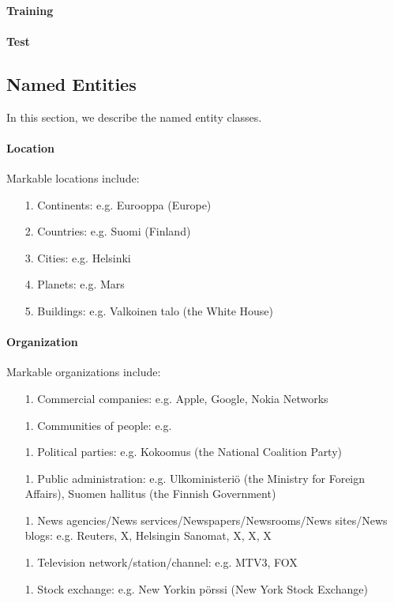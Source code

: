 \documentclass[11pt]{article}
\begin{document}
\paragraph{Training}

  

\paragraph{Test}



\subsection{Named Entities}

In this section, we describe the named entity classes.


\paragraph{Location}

Markable locations include:

\begin{itemize}

\item[1.] Continents: e.g. Eurooppa (Europe)
\item[2.] Countries: e.g. Suomi (Finland)
\item[3.] Cities: e.g. Helsinki
\item[4.] Planets: e.g. Mars
\item[5.] Buildings: e.g. Valkoinen talo (the White House)

\end{itemize}


\paragraph{Organization}

Markable organizations include:

\begin{itemize}

\item[1.] Commercial companies: e.g. Apple, Google, Nokia Networks
\item[1.] Communities of people: e.g. 
\item[1.] Political parties: e.g. Kokoomus (the National Coalition Party)
\item[1.] Public administration: e.g. Ulkoministeri\"o (the Ministry for Foreign Affairs), Suomen hallitus (the Finnish Government)
\item[1.] News agencies/News services/Newspapers/Newsrooms/News sites/News blogs: e.g. Reuters, X, Helsingin Sanomat, X, X, X 
\item[1.] Television network/station/channel: e.g. MTV3, FOX
\item[1.] Stock exchange: e.g. New Yorkin p\"orssi (New York Stock Exchange)

\end{itemize}
\end{document}
